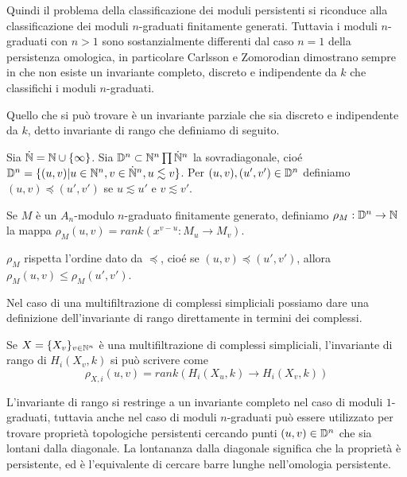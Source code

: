 Quindi il problema della classificazione dei moduli persistenti si riconduce alla classificazione dei moduli $n$-graduati finitamente generati. Tuttavia i moduli $n$-graduati con $n>1$ sono sostanzialmente differenti dal caso $n=1$ della persistenza omologica, in particolare Carlsson e Zomorodian dimostrano sempre in \cite{Carlsson2009a} che non esiste un invariante completo, discreto e indipendente da $k$ che classifichi i moduli $n$-graduati.

Quello che si può trovare è un invariante parziale che sia discreto e indipendente da $k$, detto invariante di rango che definiamo di seguito.

\begin{definition}
  Sia $\dot{\mathbb{N}}=\mathbb{N}\cup\{\infty\}$. Sia $\mathbb{D}^n \subset \mathbb{N}^n\prod \dot{\mathbb{N}}^n$ la sovradiagonale, cioé $\mathbb{D}^n = \{(u,v)| u\in \mathbb{N}^n, v\in \dot{\mathbb{N}}^n,u\lesssim v\}$. Per $(u,v), (u',v')\in\mathbb{D}^n$ definiamo $(u,v)\preceq (u',v')$ se $u\lesssim u'$ e $v\lesssim v'$.
\end{definition}

\begin{definition}
  Se $M$ è un $A_n$-modulo $n$-graduato finitamente generato, definiamo $\rho_M:\mathbb{D}^n\to \mathbb{N}$ la mappa $\rho_M(u,v)=rank(x^{v-u}:M_u\to M_v)$.
\end{definition}

\begin{rmk}
  $\rho_M$ rispetta l'ordine dato da $\preceq$, cioé se $(u,v)\preceq (u',v')$, allora $\rho_M(u,v)\leq \rho_M(u',v')$.
\end{rmk}

Nel caso di una multifiltrazione di complessi simpliciali possiamo dare una definizione dell'invariante di rango direttamente in termini dei complessi.

\begin{definition}
  Se $X=\{X_v\}_{v\in\mathbb{N}^n}$ è una multifiltrazione di complessi simpliciali, l'invariante di rango di $H_i(X_v,k)$ si può scrivere come
  \begin{equation*}
    \rho_{X,i}(u,v) = rank(H_i(X_u,k)\to H_i(X_v,k))
  \end{equation*}
\end{definition}

L'invariante di rango si restringe a un invariante completo nel caso di moduli $1$-graduati, tuttavia anche nel caso di moduli $n$-graduati può essere utilizzato per trovare proprietà topologiche persistenti cercando punti $(u,v)\in \mathbb{D}^n$ che sia lontani dalla diagonale. La lontananza dalla diagonale significa che la proprietà è persistente, ed è l'equivalente di cercare barre lunghe nell'omologia persistente.

